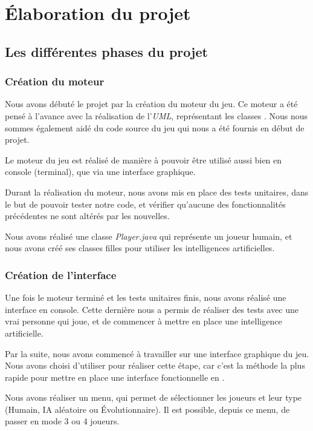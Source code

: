 \section{Élaboration du projet}

\subsection{Les différentes phases du projet}
	\subsubsection{Création du moteur}
		
		Nous avons débuté le projet par la création du moteur du jeu.
		Ce moteur a été pensé à l'avance avec la réalisation de l'\emph{UML},
		représentant les classes \java.
		Nous nous sommes également aidé du code source du jeu qui nous a été fournis
		en début de projet.
		
		Le moteur du jeu est réalisé de manière à pouvoir être utilisé aussi bien en
		console (terminal), que via une interface graphique.
		
		Durant la réalisation du moteur, nous avons mis en place des tests unitaires,
		dans le but de pouvoir tester notre code, et vérifier qu'aucune des
		fonctionnalités précédentes ne sont altérés par les nouvelles.
		
		Nous avons réalisé une classe \emph{Player.java} qui représente un joueur humain,
		et nous avons créé ses classes filles pour utiliser les intelligences artificielles.
		
	\subsubsection{Création de l'interface}
	
		Une fois le moteur terminé et les tests unitaires finis, nous avons réalisé une interface en console.
		Cette dernière nous a permis de réaliser des tests avec une vrai personne qui joue, et de commencer à mettre en place une intelligence artificielle.
		
		Par la suite, nous avons commencé à travailler sur une interface graphique
		du jeu. Nous avons choisi d'utiliser \fx pour réaliser cette étape, car c'est
		la méthode la plus rapide pour mettre en place une interface fonctionnelle en \java.
		
		Nous avons réaliser un menu, qui permet de sélectionner les joueurs et leur type
		(Humain, IA aléatoire ou Évolutionnaire). Il est possible, depuis ce menu, de
		passer en mode 3 ou 4 joueurs.
		
